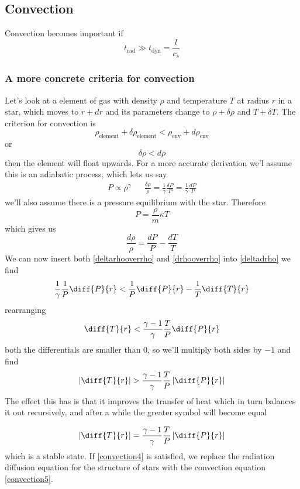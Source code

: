 \subsection{Convection}
Convection becomes important if
\begin{equation}
	t_{\text{rad}} \gg t_{\text{dyn}} = \frac{l}{c_s}
\end{equation}
\subsubsection{A more concrete criteria for convection}
Let's look at a element of gas with density $\rho$ and temperature $T$ at radius $r$ in a star, which moves to $r+dr$ and its parameters change to $\rho+\delta\rho$ and $T+\delta T$. The criterion for convection is
\begin{equation}
	\rho_{\text{element}}+\delta\rho_{\text{element}} < \rho_{\text{env}} + d\rho_{\text{env}}
\end{equation}
or
\begin{equation}\label{deltadrho}
	\delta\rho < d\rho
\end{equation}
then the element will float upwards. For a more accurate derivation we'l assume this is an adiabatic process, which lets us say
\begin{align}\label{deltarhooverrho}
	P\propto \rho^\gamma && \frac{\delta\rho}{\rho} = \frac{1}{\gamma}\frac{\delta P}{P} = \frac{1}{\gamma}\frac{dP}{P}
\end{align}
we'll also assume there is a pressure equilibrium with the star. Therefore
\begin{equation}
	P = \frac{\rho}{m}\kappa T
\end{equation}
which gives us
\begin{equation}\label{drhooverrho}
	\frac{d\rho}{\rho} = \frac{dP}{P}-\frac{dT}{T}
\end{equation}
We can now insert both \ref{deltarhooverrho} and \ref{drhooverrho} into \ref{deltadrho} we find
\begin{equation}
	\frac{1}{\gamma}\frac{1}{P}\diff{P}{r} < \frac{1}{P}\diff{P}{r}-\frac{1}{T}\diff{T}{r}
\end{equation}
rearranging
\begin{equation}
	\diff{T}{r} < \frac{\gamma-1}{\gamma}\frac{T}{P}\diff{P}{r}
\end{equation}
both the differentials are smaller than 0, so we'll multiply both sides by $-1$ and find
\begin{equation}\label{convection4}
	\left\lvert\diff{T}{r}\right\rvert > \frac{\gamma-1}{\gamma}\frac{T}{P}\left\lvert\diff{P}{r}\right\rvert
\end{equation}
The effect this has is that it improves the transfer of heat which in turn balances it out recursively, and after a while the greater symbol will become equal

\begin{equation}\label{convection5}
	\left\lvert\diff{T}{r}\right\rvert = \frac{\gamma-1}{\gamma}\frac{T}{P}\left\lvert\diff{P}{r}\right\rvert
\end{equation}
which is a stable state. If \ref{convection4} is satisfied, we replace the radiation diffusion equation for the structure of stars with the convection equation \ref{convection5}.